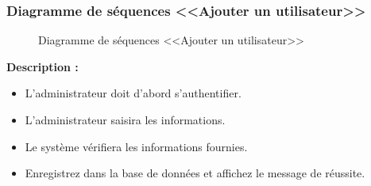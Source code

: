 \documentclass[12pt]{report}
\begin{document}
\newpage

\subsubsection{Diagramme de séquences <<Ajouter un utilisateur>>}

\begin{figure}[h]
\centering
    \centerline{}
    \caption{Diagramme de séquences <<Ajouter un utilisateur>>}
\end{figure}

\vspace{0.3in}

\textbf{Description :}

\begin{itemize}
    \item L'administrateur doit d'abord s'authentifier.
    \item L'administrateur saisira les informations.
    \item Le système vérifiera les informations fournies.
    \item Enregistrez dans la base de données et affichez le message de réussite.
\end{itemize}
\end{document}
